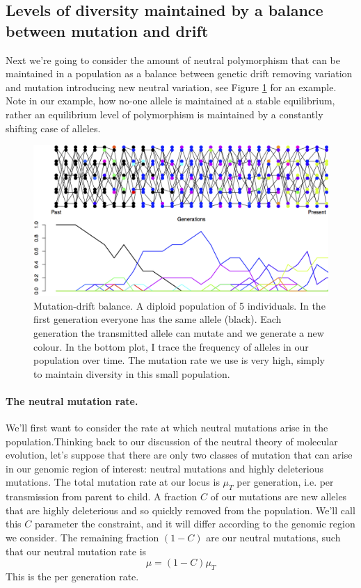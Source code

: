 \subsection{Levels of diversity maintained by a balance between
 mutation and drift} \label{DriftMutationBalance}

Next we're going to consider the amount of neutral polymorphism that can be maintained in a population as a balance between genetic drift removing variation and mutation introducing new neutral variation, see Figure \ref{fig:Mut_Sel_balance} for an example. Note in our example, how no-one allele is maintained at a stable equilibrium, rather an equilibrium level of polymorphism is maintained by a constantly shifting case of alleles. 

\begin{figure} \begin{center} \includegraphics[width= 0.8
\textwidth]{figures/Mut_drift_balance.png} \end{center} \caption{Mutation-drift
balance. A diploid population of 5 individuals. In the first generation
everyone has the same allele (black). Each generation the transmitted allele
can mutate and we generate a new colour. In the bottom plot, I trace the
frequency of alleles in our population over time. The mutation rate we use is very high, simply to maintain diversity in this small population. } \label{fig:Mut_Sel_balance}
\end{figure} 

\paragraph{The neutral mutation rate.} 
We'll first want to consider the rate at which neutral mutations arise in the population.Thinking back to our discussion of the neutral theory of molecular evolution, let's suppose that there are only two classes of mutation that can arise in our genomic region of interest: neutral mutations and highly deleterious mutations. The total mutation rate at our locus is $\mu_T$ per generation, i.e. per transmission from parent to child. A fraction $C$ of our mutations are new alleles that are highly deleterious and so quickly removed from the population. We'll call this $C$ parameter the constraint, and it will differ according to the genomic region we consider.  The remaining fraction $(1-C)$ are our neutral mutations, such that our neutral mutation rate is 
\begin{equation}
\mu = (1-C) \mu_T
\end{equation}
This is the per generation rate.

